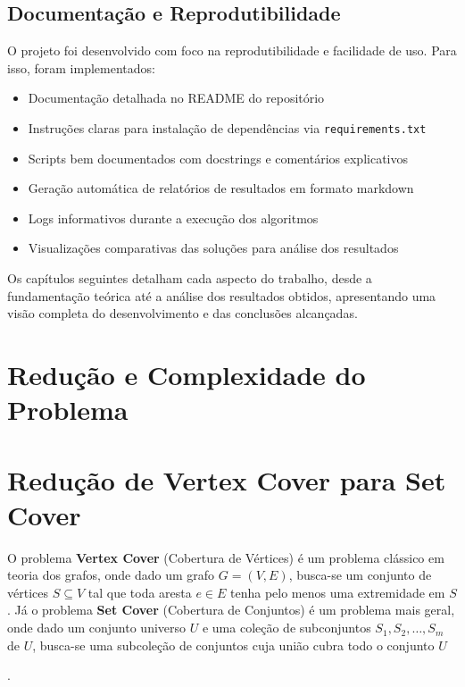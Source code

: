 \documentclass[12pt, a4paper]{report}
\begin{document}
\subsection{Documentação e Reprodutibilidade}
O projeto foi desenvolvido com foco na reprodutibilidade e facilidade de uso. Para isso, foram implementados:

\begin{itemize}
    \item Documentação detalhada no README do repositório
    \item Instruções claras para instalação de dependências via \texttt{requirements.txt}
    \item Scripts bem documentados com docstrings e comentários explicativos
    \item Geração automática de relatórios de resultados em formato markdown
    \item Logs informativos durante a execução dos algoritmos
    \item Visualizações comparativas das soluções para análise dos resultados
\end{itemize}

Os capítulos seguintes detalham cada aspecto do trabalho, desde a fundamentação teórica até a análise dos resultados obtidos, apresentando uma visão completa do desenvolvimento e das conclusões alcançadas.

\section{Redução e Complexidade do Problema}

\section*{Redução de Vertex Cover para Set Cover}

O problema \textbf{Vertex Cover} (Cobertura de Vértices) é um problema clássico em teoria dos grafos, onde dado um grafo \(G = (V, E)\), busca-se um conjunto de vértices \(S \subseteq V\) tal que toda aresta \(e \in E\) tenha pelo menos uma extremidade em \(S\) 
\cite{kleinberg2006algorithm}. Já o problema \textbf{Set Cover} (Cobertura de Conjuntos) é um problema mais geral, onde dado um conjunto universo \(U\) e uma coleção de subconjuntos \(S_1, S_2, \dots, S_m\) de \(U\), busca-se uma subcoleção de conjuntos cuja união cubra todo o conjunto \(U\) 

\cite{kleinberg2006algorithm}.
\end{document}
